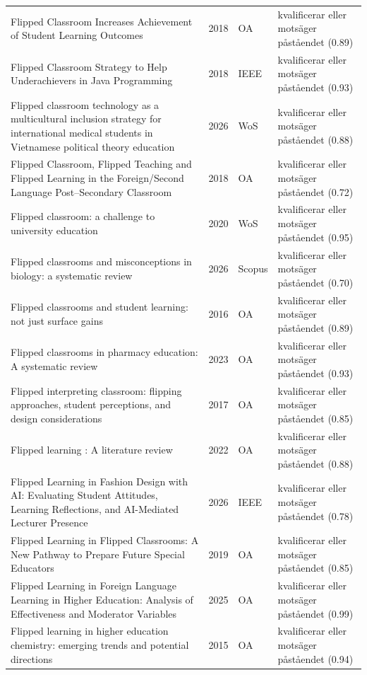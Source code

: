 \begin{longtable}{@{}%
  >{\raggedright\arraybackslash}p{}c%
  >{\raggedright\arraybackslash}p{}%
  >{\raggedright\arraybackslash}p{}@{}}
Flipped Classroom Increases Achievement of Student Learning Outcomes & 2018 & OA & kvalificerar eller motsäger påståendet (0.89) \\
Flipped Classroom Strategy to Help Underachievers in Java Programming & 2018 & IEEE & kvalificerar eller motsäger påståendet (0.93) \\
Flipped classroom technology as a multicultural inclusion strategy for international medical students in Vietnamese political theory education & 2026 & WoS & kvalificerar eller motsäger påståendet (0.88) \\
Flipped Classroom, Flipped Teaching and Flipped Learning in the Foreign/Second Language Post--Secondary Classroom & 2018 & OA & kvalificerar eller motsäger påståendet (0.72) \\
Flipped classroom: a challenge to university education & 2020 & WoS & kvalificerar eller motsäger påståendet (0.95) \\
Flipped classrooms and misconceptions in biology: a systematic review & 2026 & Scopus & kvalificerar eller motsäger påståendet (0.70) \\
Flipped classrooms and student learning: not just surface gains & 2016 & OA & kvalificerar eller motsäger påståendet (0.89) \\
Flipped classrooms in pharmacy education: A systematic review & 2023 & OA & kvalificerar eller motsäger påståendet (0.93) \\
Flipped interpreting classroom: flipping approaches, student perceptions, and design considerations & 2017 & OA & kvalificerar eller motsäger påståendet (0.85) \\
Flipped learning : A literature review & 2022 & OA & kvalificerar eller motsäger påståendet (0.88) \\
Flipped Learning in Fashion Design with AI: Evaluating Student Attitudes, Learning Reflections, and AI-Mediated Lecturer Presence & 2026 & IEEE & kvalificerar eller motsäger påståendet (0.78) \\
Flipped Learning in Flipped Classrooms: A New Pathway to Prepare Future Special Educators & 2019 & OA & kvalificerar eller motsäger påståendet (0.85) \\
Flipped Learning in Foreign Language Learning in Higher Education: Analysis of Effectiveness and Moderator Variables & 2025 & OA & kvalificerar eller motsäger påståendet (0.99) \\
Flipped learning in higher education chemistry: emerging trends and potential directions & 2015 & OA & kvalificerar eller motsäger påståendet (0.94) \\

\end{longtable}
